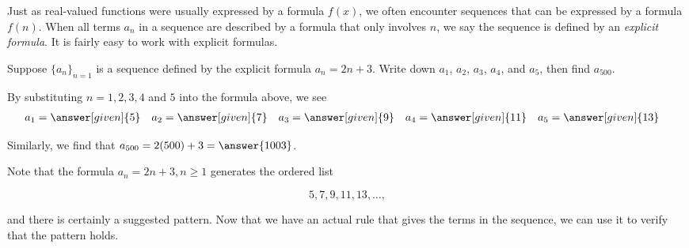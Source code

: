 \documentclass{ximera}
\begin{document}
Just as real-valued functions were usually expressed by a formula $f(x)$, we often encounter sequences that can be expressed by a formula $f(n)$.  When all terms $a_n$ in a sequence are described by a formula that only involves $n$, we say the sequence is defined by an \emph{explicit formula}. It is fairly easy to work with explicit formulas.

\begin{example}
Suppose $\{a_n\}_{n=1}$ is a sequence defined by the explicit formula $a_n = 2n+3$.  Write down $a_1$, $a_2$, $a_3$, $a_4$, and $a_5$, then find $a_{500}$.

  \begin{explanation}
    By substituting $n=1, 2, 3, 4$ and $5$ into the formula above, we see
    \begin{align*}
      a_1 &= \answer[given]{5} & 
      a_2 &= \answer[given]{7} & 
      a_3 &= \answer[given]{9} & 
      a_4 &= \answer[given]{11} & 
      a_5 &= \answer[given]{13} 
    \end{align*}

Similarly, we find that $a_{500} = 2(500)+3 = \answer{1003}$.

\end{explanation}

Note that the formula $a_n = 2n+3, n \geq 1$ generates the ordered list 

\[
5,7,9,11,13, \dots ,
\]   

and there is certainly a suggested pattern. Now that we have an actual rule that gives the terms in the sequence, we can use it to verify that the pattern holds.
  
\end{example}




%
%  
\end{document}
